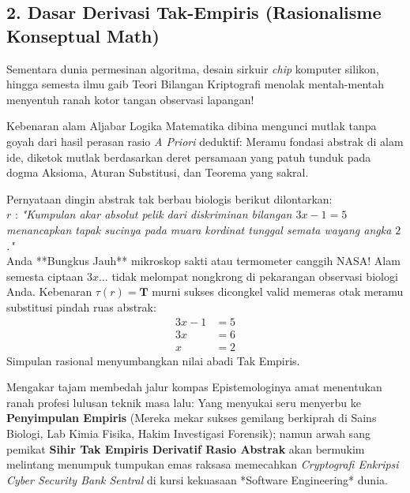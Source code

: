 \subsection{2. Dasar Derivasi Tak-Empiris (Rasionalisme Konseptual Math)}

Sementara dunia permesinan algoritma, desain sirkuir \textit{chip} komputer silikon, hingga semesta ilmu gaib Teori Bilangan Kriptografi menolak mentah-mentah menyentuh ranah kotor tangan observasi lapangan! \cite{wiki_first_order_logic} 

Kebenaran alam Aljabar Logika Matematika dibina mengunci mutlak tanpa goyah dari hasil perasan rasio \textit{A Priori} deduktif: Meramu fondasi abstrak di alam ide, diketok mutlak berdasarkan deret persamaan yang patuh tunduk pada dogma Aksioma, Aturan Substitusi, dan Teorema yang sakral. 

\begin{contoh}
Pernyataan dingin abstrak tak berbau biologis berikut dilontarkan: \\
\indent $r$ : \textit{"Kumpulan akar absolut pelik dari diskriminan bilangan $3x - 1 = 5$ menancapkan tapak sucinya pada muara kordinat tunggal semata wayang angka $2$."} \\
Anda **Bungkus Jauh** mikroskop sakti atau termometer canggih NASA! Alam semesta ciptaan $3x \dots$ tidak melompat nongkrong di pekarangan observasi biologi Anda. Kebenaran $\tau(r) = \mathbf{T}$ murni sukses dicongkel valid memeras otak meramu substitusi pindah ruas abstrak: 
\begin{align*}
    3x - 1 &= 5 \\
    3x &= 6 \\
    x &= 2
\end{align*}
Simpulan rasional menyumbangkan nilai abadi Tak Empiris.
\end{contoh}

Mengakar tajam membedah jalur kompas Epistemologinya amat menentukan ranah profesi lulusan teknik masa lalu: Yang menyukai seru menyerbu ke \textbf{Penyimpulan Empiris} (Mereka mekar sukses gemilang berkiprah di Sains Biologi, Lab Kimia Fisika, Hakim Investigasi Forensik); namun arwah sang pemikat \textbf{Sihir Tak Empiris Derivatif Rasio Abstrak} akan bermukim melintang menumpuk tumpukan emas raksasa memecahkan \textit{Cryptografi Enkripsi Cyber Security Bank Sentral} di kursi kekuasaan *Software Engineering* dunia.
